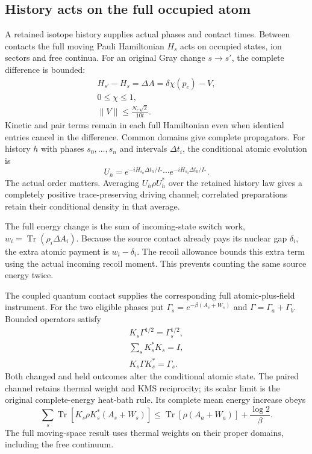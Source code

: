 \subsection{History acts on the full occupied atom}

A retained isotope history supplies actual phases and contact times. Between contacts the full moving Pauli Hamiltonian $H_s$ acts on occupied states, ion sectors and free continua. For an original Gray change $s\to s'$, the complete difference is bounded:
\[
\begin{gathered}
H_{s'}-H_s=\Delta A=\delta\chi(p_c)-V,
 \\
 0\leq\chi\leq1,
 \\
 \|V\|\leq\frac{N_e\sqrt2}{10t}.
\end{gathered}
\]
Kinetic and pair terms remain in each full Hamiltonian even when identical entries cancel in the difference. Common domains give complete propagators. For history $h$ with phases $s_0,\ldots,s_n$ and intervals $\Delta t_i$, the conditional atomic evolution is
\[
 U_h=e^{-iH_{s_n}\Delta t_n/I_*}\cdots
       e^{-iH_{s_0}\Delta t_0/I_*}.
\]
The actual order matters. Averaging $U_h\rho U_h^*$ over the retained history law gives a completely positive trace-preserving driving channel; correlated preparations retain their conditional density in that average. 

The full energy change is the sum of incoming-state switch work, $w_i=\operatorname{Tr}(\rho_i\Delta A_i)$. Because the source contact already pays its nuclear gap $\delta_i$, the extra atomic payment is $w_i-\delta_i$. The recoil allowance bounds this extra term using the actual incoming recoil moment. This prevents counting the same source energy twice.

The coupled quantum contact supplies the corresponding full atomic-plus-field instrument. For the two eligible phases put $\Gamma_s=e^{-\beta(A_s+W_s)}$ and $\Gamma=\Gamma_a+\Gamma_b$. Bounded operators satisfy
\[
\begin{gathered}
K_s\Gamma^{1/2}=\Gamma_s^{1/2},\\
 \sum_sK_s^*K_s=I,\\
 K_s\Gamma K_s^*=\Gamma_s.
\end{gathered}
\]
Both changed and held outcomes alter the conditional atomic state. The paired channel retains thermal weight and KMS reciprocity; its scalar limit is the original complete-energy heat-bath rule. Its complete mean energy increase obeys
\[
 \sum_s\operatorname{Tr}[K_s\rho K_s^*(A_s+W_s)]
 \leq\operatorname{Tr}[\rho(A_a+W_a)]+\frac{\log2}{\beta}.
\]
The full moving-space result uses thermal weights on their proper domains, including the free continuum. 

